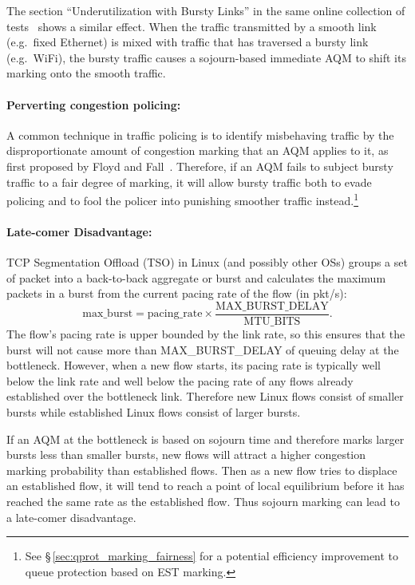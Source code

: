 The section ``Underutilization with Bursty Links'' in the same online collection of tests~\cite{Heist20:L4S_tests} shows a similar effect. When the traffic transmitted by a smooth link (e.g.\ fixed Ethernet) is mixed with traffic that has traversed a bursty link (e.g.\ WiFi), the bursty traffic causes a sojourn-based immediate AQM to shift its marking onto the smooth traffic.

\paragraph{Perverting congestion policing:} A common technique in traffic policing is to identify misbehaving traffic by the disproportionate amount of congestion marking that an AQM applies to it, as first proposed by Floyd and Fall~\cite{Floyd99:Penalty_box}. Therefore, if an AQM fails to subject bursty traffic to a fair degree of marking, it will allow bursty traffic both to evade policing and to fool the policer into punishing smoother traffic instead.\footnote{See \S\,\ref{sec:qprot_marking_fairness} for a potential efficiency improvement to queue protection based on EST marking.}

\paragraph{Late-comer Disadvantage:} TCP Segmentation Offload (TSO) in Linux (and possibly other OSs) groups a set of packet into a back-to-back aggregate or burst and calculates the maximum packets in a burst from the current pacing rate of the flow (in pkt/s):
\[\mathrm{max\_burst} = \mathrm{pacing\_rate}\times \frac{\mathrm{MAX\_BURST\_DELAY}}{\mathrm{MTU\_BITS}}.\]
The flow's pacing rate is upper bounded by the link rate, so this ensures that the burst will not cause more than MAX\_BURST\_DELAY of queuing delay at the bottleneck. However, when a new flow starts, its pacing rate is typically well below the link rate and well below the pacing rate of any flows already established over the bottleneck link. Therefore new Linux flows consist of smaller bursts while established Linux flows consist of larger bursts. 

If an AQM at the bottleneck is based on sojourn time and therefore marks larger bursts less than smaller bursts, new flows will attract a higher congestion marking probability than established flows. Then as a new flow tries to displace an established flow, it will tend to reach a point of local equilibrium before it has reached the same rate as the established flow. Thus sojourn marking can lead to a late-comer disadvantage.

